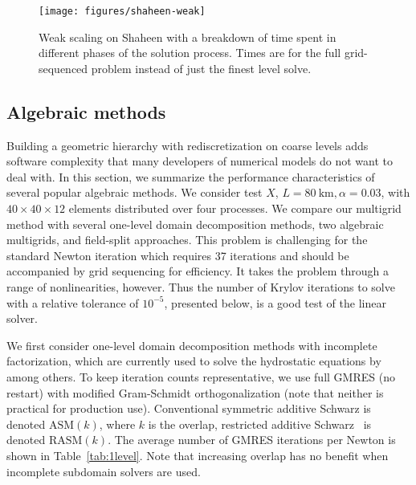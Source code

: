 \documentclass[3p]{elsarticle}
\newcommand{\ASM}{\mathrm{ASM}}
\newcommand{\RASM}{\mathrm{RASM}}
\begin{document}
\begin{figure}
  \texttt{[image: figures/shaheen-weak]}
  \centering\caption{Weak scaling on Shaheen with a breakdown of time spent in different phases of the solution process.
    Times are for the full grid-sequenced problem instead of just the finest level solve.}\label{fig:shaheen-weak}
\end{figure}

\subsection{Algebraic methods}\label{sec:1level}
Building a geometric hierarchy with rediscretization on coarse levels adds software complexity that many developers of numerical models do not want to deal with.  In this section, we summarize the performance characteristics of several popular algebraic methods.  We consider test $X$, $L = \SI{80}{\kilo\metre}, \alpha=0.03$, with $40\times 40\times 12$ elements distributed over four processes. We compare our multigrid method with several one-level domain decomposition methods, two algebraic multigrids, and field-split approaches. This problem is challenging for the standard Newton iteration which requires 37 iterations and should be accompanied by grid sequencing for efficiency. It takes the problem through a range of nonlinearities, however. Thus the number of Krylov iterations to solve with a relative tolerance of $10^{-5}$, presented below, is a good test of the linear solver.

We first consider one-level domain decomposition methods with incomplete factorization, which are currently used to solve the hydrostatic equations by \cite{seacism,issm} among others.  To keep iteration counts representative, we use full GMRES (no restart) with modified Gram-Schmidt orthogonalization (note that neither is practical for production use).  Conventional symmetric additive Schwarz is denoted $\ASM(k)$, where $k$ is the overlap, restricted additive Schwarz~\cite{cai1999restricted} is denoted $\RASM(k)$.  The average number of GMRES iterations per Newton is shown in Table~\ref{tab:1level}.  Note that increasing overlap has no benefit when incomplete subdomain solvers are used.
\end{document}
